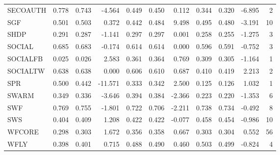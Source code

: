 \begin{tabular}{lrrrrrrrrrr}
SECOAUTH      & 0.778 &     0.743 &               -4.564 &     0.449 &         0.450 &                    0.112 &       0.344 &           0.320 &                     -6.895 &      2 \\
SGF           & 0.501 &     0.503 &                0.372 &     0.442 &         0.484 &                    9.498 &       0.495 &           0.480 &                     -3.191 &     10 \\
SHDP          & 0.291 &     0.287 &               -1.141 &     0.297 &         0.297 &                    0.001 &       0.258 &           0.255 &                     -1.275 &      3 \\
SOCIAL        & 0.685 &     0.683 &               -0.174 &     0.614 &         0.614 &                    0.000 &       0.596 &           0.591 &                     -0.752 &      3 \\
SOCIALFB      & 0.025 &     0.026 &                2.583 &     0.361 &         0.364 &                    0.769 &       0.309 &           0.305 &                     -1.164 &      1 \\
SOCIALTW      & 0.638 &     0.638 &                0.000 &     0.606 &         0.610 &                    0.687 &       0.410 &           0.419 &                      2.213 &      2 \\
SPR           & 0.500 &     0.442 &              -11.571 &     0.333 &         0.342 &                    2.500 &       0.125 &           0.126 &                      1.032 &      1 \\
SWARM         & 0.349 &     0.336 &               -3.646 &     0.394 &         0.384 &                   -2.366 &       0.223 &           0.220 &                     -1.353 &      6 \\
SWF           & 0.769 &     0.755 &               -1.801 &     0.722 &         0.706 &                   -2.211 &       0.738 &           0.734 &                     -0.492 &      8 \\
SWS           & 0.404 &     0.409 &                1.208 &     0.422 &         0.422 &                   -0.077 &       0.458 &           0.454 &                     -0.986 &     10 \\
WFCORE        & 0.298 &     0.303 &                1.672 &     0.356 &         0.358 &                    0.667 &       0.303 &           0.304 &                      0.552 &     56 \\
WFLY          & 0.398 &     0.401 &                0.715 &     0.488 &         0.490 &                    0.460 &       0.503 &           0.499 &                     -0.824 &      4 \\
\bottomrule
\end{tabular}
